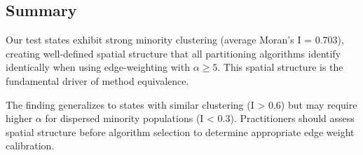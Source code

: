 \subsection{Summary}

Our test states exhibit strong minority clustering (average Moran's I = 0.703), creating well-defined spatial structure that all partitioning algorithms identify identically when using edge-weighting with $\alpha \geq 5$. This spatial structure is the fundamental driver of method equivalence.

The finding generalizes to states with similar clustering (I > 0.6) but may require higher $\alpha$ for dispersed minority populations (I < 0.3). Practitioners should assess spatial structure before algorithm selection to determine appropriate edge weight calibration.
